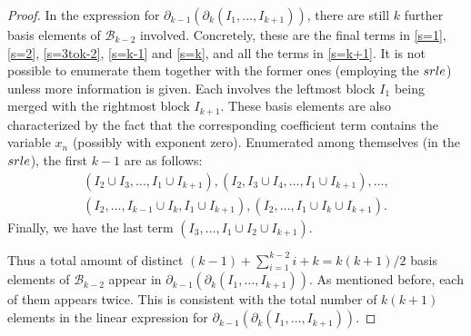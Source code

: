 \documentclass[10pt]{amsart}
\newcommand{\mcb}{\mbox{$\mathcal{B}$}}
\newcommand{\dif}{\mbox{$\partial$}}
\newcommand{\srle}{\mbox{${\rm srle}$}}
\theoremstyle{definition}
\theoremstyle{remark}
\begin{document}
\begin{proof}
In the expression for $\dif_{k-1}(\dif_{k}(I_1,\ldots,I_{k+1}))$,
there are still $k$ further basis elements of $\mcb_{k-2}$
involved. Concretely, these are the final terms in \eqref{s=1},
\eqref{s=2}, \eqref{s=3tok-2}, \eqref{s=k-1} and \eqref{s=k}, and all
the terms in \eqref{s=k+1}. It is not possible to enumerate them
together with the former ones (employing the $\srle$) unless more
information is given. Each involves the leftmost block $I_1$ being
merged with the rightmost block $I_{k+1}$. These basis elements are
also characterized by the fact that the corresponding coefficient term
contains the variable $x_n$ (possibly with exponent zero). Enumerated
among themselves (in the $\srle$), the first $k-1$ are as follows:
\begin{multline*}
(I_2\cup I_3,\ldots ,I_1\cup I_{k+1}),(I_2,I_3\cup I_4,\ldots ,I_1\cup
  I_{k+1}),\ldots ,\\(I_2,\ldots ,I_{k-1}\cup I_k,I_1\cup I_{k+1}),
  (I_2,\ldots ,I_1\cup I_k\cup I_{k+1}).
\end{multline*}
Finally, we have the last term $(I_3,\ldots ,I_1\cup I_2\cup
I_{k+1})$.

Thus a total amount of distinct $(k-1)+\sum_{i=1}^{k-2}i+k=k(k+1)/2$
basis elements of $\mcb_{k-2}$ appear in
$\dif_{k-1}(\dif_{k}(I_1,\ldots,I_{k+1}))$. As mentioned before, each
of them appears twice. This is consistent with the total number of
$k(k+1)$ elements in the linear expression for
$\dif_{k-1}(\dif_{k}(I_1,\ldots,I_{k+1}))$.


\end{proof}
\end{document}

